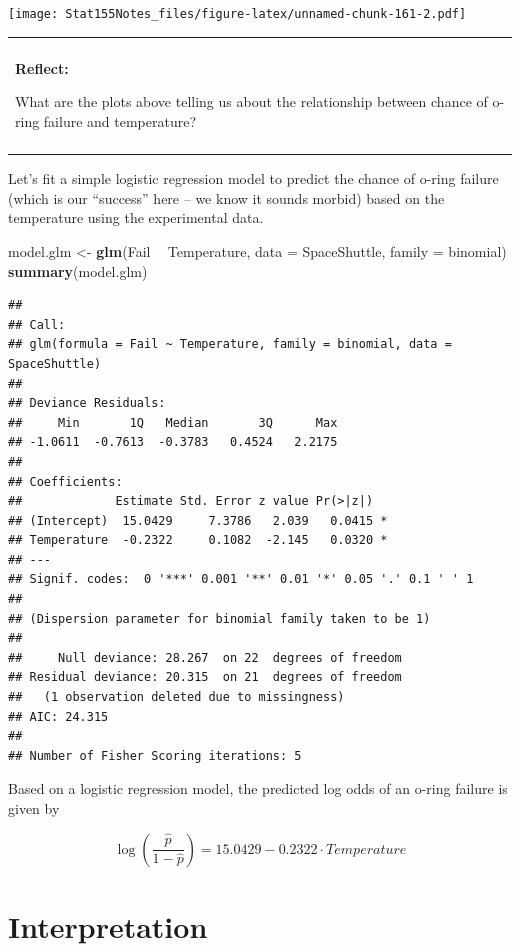 \documentclass[]{book}
\newenvironment{Shaded}{\begin{snugshade}}{\end{snugshade}}
\newcommand{\DataTypeTok}[1]{\textcolor[rgb]{0.13,0.29,0.53}{#1}}
\newcommand{\KeywordTok}[1]{\textcolor[rgb]{0.13,0.29,0.53}{\textbf{#1}}}
\newcommand{\NormalTok}[1]{#1}
\newcommand{\OperatorTok}[1]{\textcolor[rgb]{0.81,0.36,0.00}{\textbf{#1}}}
\newcommand{\StringTok}[1]{\textcolor[rgb]{0.31,0.60,0.02}{#1}}
\newenvironment{reflect}
{
    \begin{center}
    
    \begin{tabular}{|p{0.8\textwidth}|}
    \rowcolor{LightBlue}
    \hline\\
    \rowcolor{LightBlue}
    \textbf{Reflect:}
}
{
    \\\rowcolor{LightBlue}
    \\\hline
    \end{tabular} 
    \end{center}
}
\begin{document}
\texttt{[image: Stat155Notes\_files/figure-latex/unnamed-chunk-161-2.pdf]}

\begin{reflect}
What are the plots above telling us about the relationship between
chance of o-ring failure and temperature?
\end{reflect}

Let's fit a simple logistic regression model to predict the chance of o-ring failure (which is our ``success'' here -- we know it sounds morbid) based on the temperature using the experimental data.

\begin{Shaded}
\begin{Highlighting}[]
\NormalTok{model.glm <-}\StringTok{ }\KeywordTok{glm}\NormalTok{(Fail }\OperatorTok{~}\StringTok{ }\NormalTok{Temperature, }\DataTypeTok{data =}\NormalTok{ SpaceShuttle, }\DataTypeTok{family =}\NormalTok{ binomial)}
\KeywordTok{summary}\NormalTok{(model.glm)}
\end{Highlighting}
\end{Shaded}

\begin{verbatim}
## 
## Call:
## glm(formula = Fail ~ Temperature, family = binomial, data = SpaceShuttle)
## 
## Deviance Residuals: 
##     Min       1Q   Median       3Q      Max  
## -1.0611  -0.7613  -0.3783   0.4524   2.2175  
## 
## Coefficients:
##             Estimate Std. Error z value Pr(>|z|)  
## (Intercept)  15.0429     7.3786   2.039   0.0415 *
## Temperature  -0.2322     0.1082  -2.145   0.0320 *
## ---
## Signif. codes:  0 '***' 0.001 '**' 0.01 '*' 0.05 '.' 0.1 ' ' 1
## 
## (Dispersion parameter for binomial family taken to be 1)
## 
##     Null deviance: 28.267  on 22  degrees of freedom
## Residual deviance: 20.315  on 21  degrees of freedom
##   (1 observation deleted due to missingness)
## AIC: 24.315
## 
## Number of Fisher Scoring iterations: 5
\end{verbatim}

Based on a logistic regression model, the predicted log odds of an o-ring failure is given by

\[\log\left(\frac{\hat{p}}{1-\hat{p}}\right) = 15.0429 -0.2322\cdot Temperature\]

\hypertarget{interpretation-1}{%
\section{Interpretation}\label{interpretation-1}}
\end{document}
